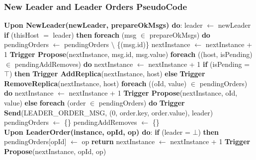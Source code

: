 \documentclass[sigconf]{acmart}
\begin{document}
\subsubsection{New Leader and Leader Orders PseudoCode}
\begin{algorithmic}[1]
\small
\State \textbf{Upon NewLeader(newLeader, prepareOkMsgs) do}:
\State \quad leader $\gets$ newLeader
\State \quad \textbf{if} (thisHost $=$ leader) \textbf{then}
\State \quad \quad \textbf{foreach} (msg $\in$ prepareOkMsgs) \textbf{do}
\State \quad \quad \quad pendingOrders $\gets$ pendingOrders $\setminus$ \{(msg.id)\}
\State \quad \quad \quad nextInstance $\gets$ nextInstance + 1
\State \quad \quad \quad \textbf{Trigger Propose}(nextInstance, msg.id, msg.value)
\State \quad \quad \textbf{foreach} ((host, isPending) $\in$ pendingAddRemoves) \textbf{do}
\State \quad \quad \quad nextInstance $\gets$ nextInstance + 1
\State \quad \quad \quad \textbf{if} (isPending = $\top$) \textbf{then}
\State \quad \quad \quad \quad \textbf{Trigger AddReplica}(nextInstance, host)
\State \quad \quad \quad \textbf{else}
\State \quad \quad \quad \quad \textbf{Trigger RemoveReplica}(nextInstance, host)
\State \quad \quad \textbf{foreach} ((oId, value) $\in$ pendingOrders) \textbf{do}
\State \quad \quad \quad nextInstance $\gets$ nextInstance + 1
\State \quad \quad \quad \textbf{Trigger Propose}(nextInstance, oId, value)
\State \quad \textbf{else}
\State \quad \quad \textbf{foreach} (order $\in$ pendingOrders) \textbf{do}
\State \quad \quad \quad \textbf{Trigger Send}(LEADER\_ORDER\_MSG, (0, order.key, order.value), leader)
\State \quad pendingOrders $\gets$ \{\} 
\State \quad pendingAddRemoves $\gets$ \{\} \\

\State \textbf{Upon LeaderOrder(instance, opId, op) do}:
\State \quad \textbf{if} (leader = $\bot$) \textbf{then}
\State \quad \quad pendingOrders[opId] $\gets$ op
\State \quad \quad \textbf{return}
\State \quad nextInstance $\gets$ nextInstance + 1 
\State \quad \textbf{Trigger Propose}(nextInstance, opId, op) \\

\end{algorithmic}
\end{document}
